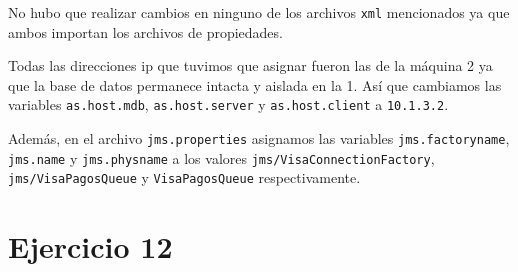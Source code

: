 \documentclass[a4paper, 10pt]{article}
\begin{document}
	No hubo que realizar cambios en ninguno de los archivos \texttt{xml} mencionados ya que ambos importan los archivos de propiedades.

	Todas las direcciones ip que tuvimos que asignar fueron las de la máquina 2 ya que la base de datos permanece intacta y aislada en la 1. Así que cambiamos las variables \texttt{as.host.mdb}, \texttt{as.host.server} y \texttt{as.host.client} a \texttt{10.1.3.2}. 

	Además, en el archivo \texttt{jms.properties} asignamos las variables \texttt{jms.factoryname}, \texttt{jms.name} y \texttt{jms.physname} a los valores \texttt{jms/VisaConnectionFactory}, \texttt{jms/VisaPagosQueue} y \texttt{VisaPagosQueue} respectivamente.


\newpage
\section{Ejercicio 12}
\end{document}
